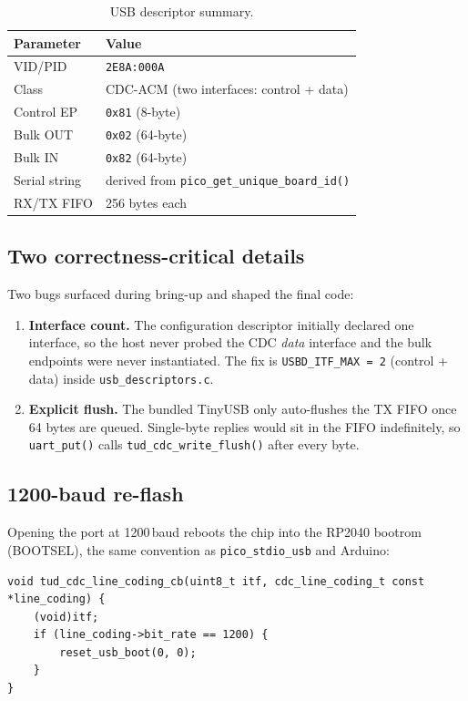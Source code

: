 \documentclass[11pt,a4paper]{article}
\begin{document}
\begin{table}[h!]
\centering
\begin{tabular}{@{}ll@{}}
\toprule
\textbf{Parameter} & \textbf{Value}\\
\midrule
VID/PID       & \texttt{2E8A:000A}\\
Class         & CDC-ACM (two interfaces: control + data)\\
Control EP    & \texttt{0x81} (8-byte)\\
Bulk OUT      & \texttt{0x02} (64-byte)\\
Bulk IN       & \texttt{0x82} (64-byte)\\
Serial string & derived from \texttt{pico\_get\_unique\_board\_id()}\\
RX/TX FIFO    & 256 bytes each\\
\bottomrule
\end{tabular}
\caption{USB descriptor summary.}
\label{tab:usb}
\end{table}

\subsection{Two correctness-critical details}

Two bugs surfaced during bring-up and shaped the final code:

\begin{enumerate}
\item \textbf{Interface count.} The configuration descriptor initially
  declared one interface, so the host never probed the CDC \emph{data}
  interface and the bulk endpoints were never instantiated. The fix is
  \texttt{USBD\_ITF\_MAX = 2} (control + data) inside
  \texttt{usb\_descriptors.c}.
\item \textbf{Explicit flush.} The bundled TinyUSB only auto-flushes the TX
  FIFO once 64 bytes are queued. Single-byte replies would sit in the FIFO
  indefinitely, so \texttt{uart\_put()} calls
  \texttt{tud\_cdc\_write\_flush()} after every byte.
\end{enumerate}

\subsection{1200-baud re-flash}

Opening the port at 1200\,baud reboots the chip into the RP2040 bootrom
(BOOTSEL), the same convention as \texttt{pico\_stdio\_usb} and Arduino:

\begin{lstlisting}[style=c]
void tud_cdc_line_coding_cb(uint8_t itf, cdc_line_coding_t const *line_coding) {
    (void)itf;
    if (line_coding->bit_rate == 1200) {
        reset_usb_boot(0, 0);
    }
}
\end{lstlisting}
\end{document}
